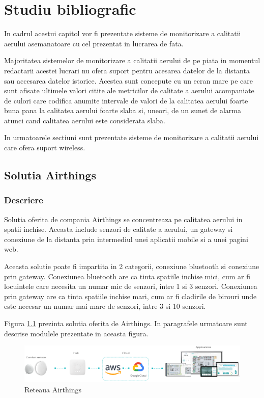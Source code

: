 \chapter{Studiu bibliografic}\label{ch:studiubib}

\pagestyle{fancy}

In cadrul acestui capitol vor fi prezentate sisteme de monitorizare a calitatii aerului asemanatoare cu cel prezentat in lucrarea de fata.

Majoritatea sistemelor de monitorizare a calitatii aerului de pe piata in momentul redactarii acestei lucrari nu ofera suport pentru acesarea datelor de 
la distanta sau accesarea datelor istorice. Acestea sunt concepute cu un ecran mare pe care sunt afisate ultimele valori citite ale metricilor de calitate a 
aerului acompaniate de culori care codifica anumite intervale de valori de la calitatea aerului foarte buna pana la calitatea aerului foarte slaba si, uneori, 
de un sunet de alarma atunci cand calitatea aerului este considerata slaba.

In urmatoarele sectiuni sunt prezentate sisteme de monitorizare a calitatii aerului care ofera suport wireless.

\section{Solutia Airthings}\label{sec:airthingsWavePlus}
\subsection{Descriere}\label{subsec:airthings_descriere}
Solutia oferita de compania Airthings se concentreaza pe calitatea aerului in spatii inchise. Aceasta include senzori de calitate a aerului, un gateway si conexiune 
de la distanta prin intermediul unei aplicatii mobile si a unei pagini web.

Aceasta solutie poate fi impartita in 2 categorii, conexiune bluetooth si conexiune prin gateway. Conexiunea bluetooth are ca tinta spatiile inchise mici, 
cum ar fi locuintele care necesita un numar mic de senzori, intre 1 si 3 senzori. Conexiunea prin gateway are ca tinta spatiile inchise mari, cum ar fi cladirile de 
birouri unde este necesar un numar mai mare de senzori, intre 3 si 10 senzori.

Figura \ref{fig:sb_airthingsNetwork} prezinta solutia oferita de Airthings. In paragrafele urmatoare sunt descrise modulele prezentate in aceasta figura.
\begin{figure}[H]
    \centering
    \includegraphics[scale=0.6]{figs/sb_airthingsNetwork.png}
    \caption{Reteaua Airthings}
    \label{fig:sb_airthingsNetwork}
\end{figure}


